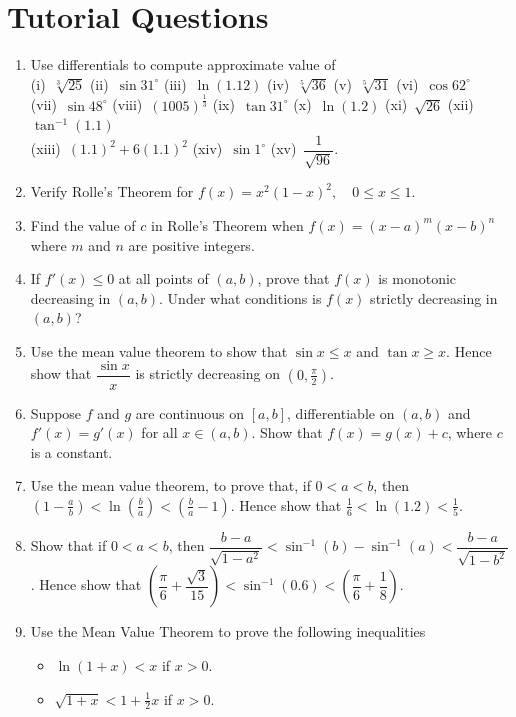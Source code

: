 \documentclass[titlepage,a4paper,12pt]{report}
\begin{document}
\section{Tutorial Questions}
\begin{enumerate}
\item Use differentials to compute approximate value of \\
(i)\, $\sqrt[3]{25}$ \quad (ii)\, $\sin 31^\circ$ \quad (iii)\, $\ln (1.12)$ \quad (iv)\, $\sqrt[5]{36}$ \quad (v)\, $\sqrt[5]{31}$ \quad (vi)\, $\cos 62^\circ$ \\
 (vii)\, $\sin 48^\circ$ \quad (viii)\, $(1005)^{\frac{1}{3}}$ \quad (ix)\, $\tan 31^\circ$ \quad (x)\, $\ln (1.2)$ \quad (xi)\, $\sqrt{26}$ \quad (xii)\, $\tan ^{-1}(1.1)$ \\ (xiii)\, $(1.1)^2+6(1.1)^2$ \quad (xiv)\, $\sin 1^\circ$ \quad (xv)\, $\dfrac{1}{\sqrt{96}}$.
 \item Verify Rolle's Theorem for $f(x)=x^2(1-x)^2, \quad 0\leq x\leq 1$.
 \item Find the value of $c$ in Rolle's Theorem when $f(x)=(x-a)^m(x-b)^n$ where $m$ and $n$ are positive integers.
 \item If $f'(x)\leq 0$ at all points of $(a,b)$, prove that $f(x)$ is monotonic decreasing in $(a,b)$. Under what conditions is $f(x)$ strictly decreasing in $(a,b)$?
 \item Use the mean value theorem to show that $\sin x \leq x$ and $\tan x\geq x$. Hence show that $\dfrac{\sin x}{x}$ is strictly decreasing on $(0,\frac{\pi}{2})$.
 \item Suppose $f$ and $g$ are continuous on $[a,b]$, differentiable on $(a,b)$ and $f'(x)=g'(x)$ for all $x\in (a,b)$. Show that $f(x)=g(x)+c$, where $c$ is a constant.
 \item Use the mean value theorem, to prove that, if $0<a<b$, then $(1-\frac{a}{b})<\ln(\frac{b}{a})<(\frac{b}{a}-1)$. Hence show that $\frac{1}{6}<\ln (1.2)<\frac{1}{5}$.
 \item Show that if $0<a<b$, then $\dfrac{b-a}{\sqrt{1-a^2}}<\sin ^{-1} (b)-\sin ^{-1}(a)<\dfrac{b-a}{\sqrt{1-b^2}}$. Hence show that $\left(\dfrac{\pi}{6}+\dfrac{\sqrt{3}}{15}\right)<\sin ^{-1}(0.6)<\left(\dfrac{\pi}{6}+\dfrac{1}{8}\right)$.
 \item Use the Mean Value Theorem to prove the following inequalities
 \begin{itemize}
 \item[(i)] $\ln (1+x) < x$ if $x>0$.
 \item[(ii)] $\sqrt{1+x} <1+\frac{1}{2}x$ if $x>0$.

\end{itemize}
\end{enumerate}
\end{document}
